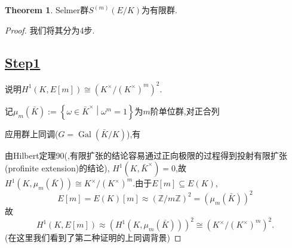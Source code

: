 \documentclass[12pt,A4paper,oneside,reqno]{amsart}
\numberwithin{equation}{section}
\theoremstyle{definition}
\newtheorem{theorem}{Theorem}[section]
\theoremstyle{plain}
\theoremstyle{plain}
\numberwithin{equation}{section}
\theoremstyle{remark}
\newcommand{\Gal}{\operatorname{Gal}}
\begin{document}
\begin{theorem}
	Selmer群$S^{(m)}(E/K)$为有限群.
\end{theorem}
\begin{proof}
	我们将其分为4步.

\subsection*{\underline{Step1}}
说明$H^1(K,E[m]) \cong (K^{\times}/(K^{\times})^m)^2$.

记$\mu_m(\bar{K}):=\left\{\omega \in \bar{K}^{\times} \middle|\omega^m=1 \right\}$为$m$阶单位群,对正合列
	\begin{center}
	\end{center}
应用群上同调($G=\Gal(\bar{K}/K)$),有
	\begin{center}
	\end{center}
由Hilbert定理90(\cite[p97, Corollary 10.4]{morandi1996gtm},有限扩张的结论容易通过正向极限的过程得到投射有限扩张(profinite extension)的结论), $H^1(K,\bar{K}^{\times})=0$,故$H^1(K,\mu_m(\bar{K}))\cong K^{\times}/(K^{\times})^m$.由于$E[m] \subseteq E(K)$,
$$E[m]=E(K)[m] \approx (\mathbb{Z}/m\mathbb{Z})^2=(\mu_m(\bar{K}))^2$$
故
$$H^1(K,E[m]) \approx (H^1(K,\mu_m(\bar{K})))^2 \cong (K^{\times}/(K^{\times})^m)^2.$$
(在这里我们看到了第二种证明的上同调背景)

\end{proof}
\end{document}
